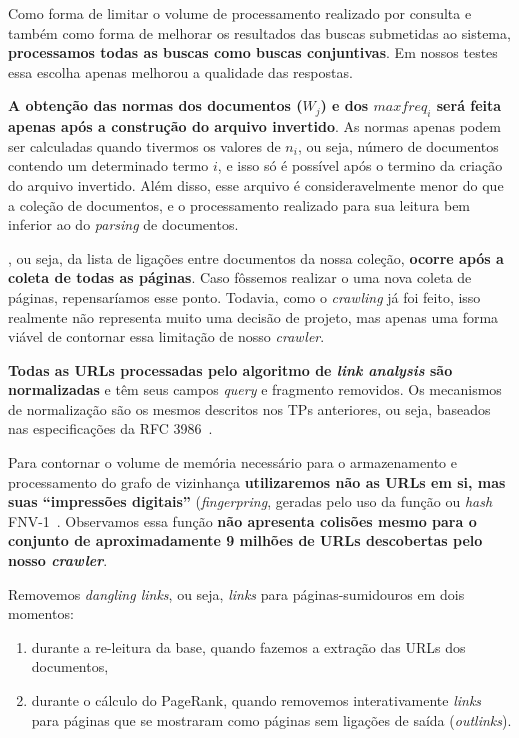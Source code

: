 \documentclass[10pt,twocolumn]{article}
\begin{document}
Como forma de limitar o volume de processamento realizado por consulta e
também como forma de melhorar os resultados das buscas submetidas ao
sistema, \textbf{processamos todas as buscas como buscas conjuntivas}.
Em nossos testes essa escolha apenas melhorou a qualidade das respostas.

\textbf{A obtenção das normas dos documentos (\(W_j\)) e dos
\(maxfreq_i\) será feita apenas após a construção do arquivo invertido}.
As normas apenas podem ser calculadas quando tivermos os valores de
\(n_i\), ou seja, número de documentos contendo um determinado termo
\(i\), e isso só é possível após o termino da criação do arquivo
invertido. Além disso, esse arquivo é consideravelmente menor do que a
coleção de documentos, e o processamento realizado para sua leitura bem
inferior ao do \emph{parsing} de documentos.

, ou seja, da lista de
ligações entre documentos da nossa coleção, \textbf{ocorre após a coleta de
todas as páginas}. Caso fôssemos realizar o uma nova coleta de páginas,
repensaríamos esse ponto. Todavia, como o \emph{crawling} já foi feito, isso
realmente não representa muito uma decisão de projeto, mas apenas uma
forma viável de contornar essa limitação de nosso \emph{crawler}.


\textbf{Todas as URLs processadas pelo algoritmo de \emph{link analysis} são
normalizadas} e têm seus campos \emph{query} e fragmento removidos. Os
mecanismos de normalização são os mesmos descritos nos TPs anteriores,
ou seja, baseados nas especificações da RFC 3986~\cite{rfc3986}.

Para contornar o volume de memória necessário para o armazenamento e
processamento do grafo de vizinhança \textbf{utilizaremos não as URLs em si, mas
suas ``impressões digitais''} (\emph{fingerpring}, geradas pelo uso da
função ou \emph{hash} FNV-1~\cite{fnv1}. Observamos essa função \textbf{não
apresenta colisões mesmo para o conjunto de aproximadamente 9 milhões de
URLs descobertas pelo nosso \emph{crawler}}.

Removemos \emph{dangling links}, ou seja, \emph{links} para
páginas-sumidouros em dois momentos:
\begin{enumerate}
\item durante a re-leitura da base, quando fazemos a extração das URLs
dos documentos,
\item durante o cálculo do PageRank, quando removemos interativamente
\emph{links} para páginas que se mostraram como páginas sem ligações de 
saída (\emph{outlinks}).
\end{enumerate}
\end{document}
